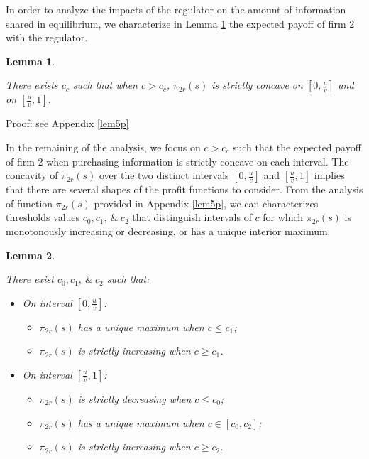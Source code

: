 \documentclass[a4paper,leqno]{article}%
\newtheorem{lemma}{Lemma}
\newcommand{\ov}{\overline{v}}
\begin{document}
\noindent In order to analyze the impacts of the regulator on the amount of information shared in equilibrium, we characterize in Lemma \ref{lem5} the expected payoff of firm 2 with the regulator. 

\begin{lemma}~~\label{lem5}

There exists $c_{c}$ such that when $c>c_{c}$, $\pi_{2r}(s)$ is strictly concave on $[0,\frac{u}{\ov}]$ and on $[\frac{u}{\ov},1]$.

\end{lemma}

\noindent Proof: see Appendix \ref{lem5p}

\noindent In the remaining of the analysis, we focus on $c>c_{c}$ such that the expected payoff of firm 2 when purchasing information is strictly concave on each interval. The concavity of $\pi_{2r}(s)$ over the two distinct intervals $[0,\frac{u}{\ov}]$ and $[\frac{u}{\ov},1]$ implies that there are several shapes of the profit functions to consider. From the analysis of function $\pi_{2r}(s)$ provided in Appendix \ref{lem5p}, we can characterizes thresholds values $c_0,c_1,~\&~c_2$ that distinguish intervals of $c$ for which $\pi_{2r}(s)$ is monotonously increasing or decreasing, or has a unique interior maximum. 

\begin{lemma}~~\label{lem7}

There exist $c_0,c_1,~\&~c_2$ such that:

\begin{itemize}
    \item On interval $[0,\frac{u}{\ov}]$:
    \begin{itemize}
        \item $\pi_{2r}(s)$ has a unique maximum when $c\leq c_1$;
        \item $\pi_{2r}(s)$ is strictly increasing when $c\geq c_1$.
    \end{itemize}
    \item On interval $[\frac{u}{\ov},1]$:
    \begin{itemize}
        \item $\pi_{2r}(s)$ is strictly decreasing when $c\leq c_0$;
        \item $\pi_{2r}(s)$ has a unique maximum when $c\in[c_0,c_2]$;
        \item $\pi_{2r}(s)$ is strictly increasing when $c\geq c_2$.
    \end{itemize}
\end{itemize}

\end{lemma}
\end{document}
